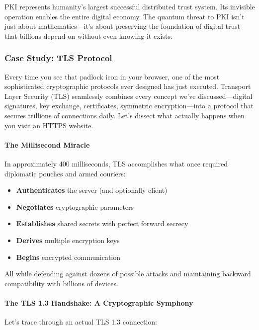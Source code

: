 \documentclass[11pt,a4paper]{article}
\begin{document}
PKI represents humanity's largest successful distributed trust system. Its invisible operation enables the entire digital economy. The quantum threat to PKI isn't just about mathematics---it's about preserving the foundation of digital trust that billions depend on without even knowing it exists.

\subsubsection{Case Study: TLS Protocol}

Every time you see that padlock icon in your browser, one of the most sophisticated cryptographic protocols ever designed has just executed. Transport Layer Security (TLS) seamlessly combines every concept we've discussed---digital signatures, key exchange, certificates, symmetric encryption---into a protocol that secures trillions of connections daily. Let's dissect what actually happens when you visit an HTTPS website.

\paragraph{The Millisecond Miracle}

In approximately 400 milliseconds, TLS accomplishes what once required diplomatic pouches and armed couriers:

\begin{itemize}
    \item \textbf{Authenticates} the server (and optionally client)
    \item \textbf{Negotiates} cryptographic parameters
    \item \textbf{Establishes} shared secrets with perfect forward secrecy
    \item \textbf{Derives} multiple encryption keys
    \item \textbf{Begins} encrypted communication
\end{itemize}

All while defending against dozens of possible attacks and maintaining backward compatibility with billions of devices.

\paragraph{The TLS 1.3 Handshake: A Cryptographic Symphony}

Let's trace through an actual TLS 1.3 connection:
\end{document}

